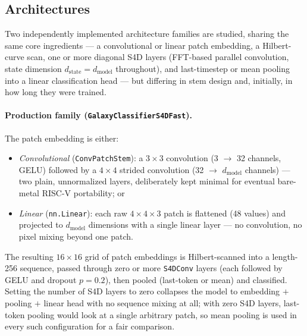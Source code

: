 \documentclass[11pt]{article}
\begin{document}
\subsection{Architectures}
\label{sec:architectures}
Two independently implemented architecture families are studied, sharing the same core
ingredients --- a convolutional or linear patch embedding, a Hilbert-curve scan, one or more
diagonal S4D layers (FFT-based parallel convolution, state dimension
$d_{\text{state}} = d_{\text{model}}$ throughout), and last-timestep or mean pooling into a
linear classification head --- but differing in stem design and, initially, in how long they
were trained.

\paragraph{Production family (\texttt{GalaxyClassifierS4DFast}).} The patch embedding is
either:
\begin{itemize}
    \item \textit{Convolutional} (\texttt{ConvPatchStem}): a $3\times3$ convolution
    (3 $\to$ 32 channels, GELU) followed by a $4\times4$ strided convolution
    (32 $\to$ $d_{\text{model}}$ channels) --- two plain, unnormalized layers, deliberately
    kept minimal for eventual bare-metal RISC-V portability; or
    \item \textit{Linear} (\texttt{nn.Linear}): each raw $4\times4\times3$ patch is flattened
    (48 values) and projected to $d_{\text{model}}$ dimensions with a single linear layer ---
    no convolution, no pixel mixing beyond one patch.
\end{itemize}
The resulting $16\times16$ grid of patch embeddings is Hilbert-scanned into a length-256
sequence, passed through zero or more \texttt{S4DConv} layers (each followed by GELU and
dropout $p{=}0.2$), then pooled (last-token or mean) and classified. Setting the number of
S4D layers to zero collapses the model to embedding $+$ pooling $+$ linear head with no
sequence mixing at all; with zero S4D layers, last-token pooling would look at a single
arbitrary patch, so mean pooling is used in every such configuration for a fair comparison.
\end{document}
